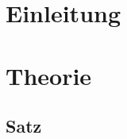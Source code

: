 \documentclass[10pt, a4paper]{article}
\begin{document}
\section{Einleitung}
\blindtext

\newpage

\section{Theorie}
\blindtext
\subsection{Satz}
\blindtext

\blindtext

\blindtext

\blindtext
\end{document}
